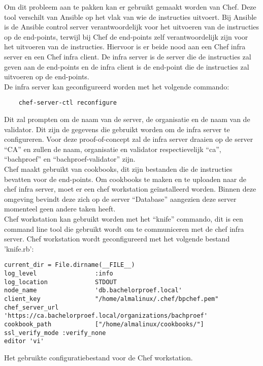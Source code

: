 Om dit probleem aan te pakken kan er gebruikt gemaakt worden van Chef. Deze tool verschilt van Ansible op het vlak van wie de instructies uitvoert. Bij Ansible is de Ansible control server verantwoordelijk voor het uitvoeren van de instructies op de end-points, terwijl bij Chef de end-points zelf verantwoordelijk zijn voor het uitvoeren van de instructies.
Hiervoor is er beide nood aan een Chef infra server en een Chef infra client. De infra server is de server die de instructies zal geven aan de end-points en de infra client is de end-point die de instructies zal uitvoeren op de end-points. \\

De infra server kan geconfigureerd worden met het volgende commando:
\begin{verbatim}
    chef-server-ctl reconfigure
\end{verbatim}

Dit zal prompten om de naam van de server, de organisatie en de naam van de validator. Dit zijn de gegevens die gebruikt worden om de infra server te configureren.
Voor deze proof-of-concept zal de infra server draaien op de server ``CA'' en zullen de naam, organisatie en validator respectievelijk ``ca'', ``bachproef'' en ``bachproef-validator'' zijn. \\

Chef maakt gebruikt van cookbooks, dit zijn bestanden die de instructies bevatten voor de end-points. 
Om cookbooks te maken en te uploaden naar de chef infra server, moet er een chef workstation geïnstalleerd worden. Binnen deze omgeving bevindt deze zich op de server ``Database'' aangezien deze server momenteel geen andere taken heeft. \\

Chef workstation kan gebruikt worden met het ``knife'' commando, dit is een command line tool die gebruikt wordt om te communiceren met de chef infra server.
Chef workstation wordt geconfigureerd met het volgende bestand 'knife.rb':
\begin{listing}[H]
\begin{verbatim}
current_dir = File.dirname(__FILE__)
log_level                :info
log_location             STDOUT
node_name                'db.bachelorproef.local'
client_key               "/home/almalinux/.chef/bpchef.pem"
chef_server_url          'https://ca.bachelorproef.local/organizations/bachproef'
cookbook_path            ["/home/almalinux/cookbooks/"]
ssl_verify_mode :verify_none
editor 'vi'
\end{verbatim}
\caption[Configuratie voor de Chef Workstation]{Het gebruikte configuratiebestand voor de Chef workstation.}
\end{listing}

